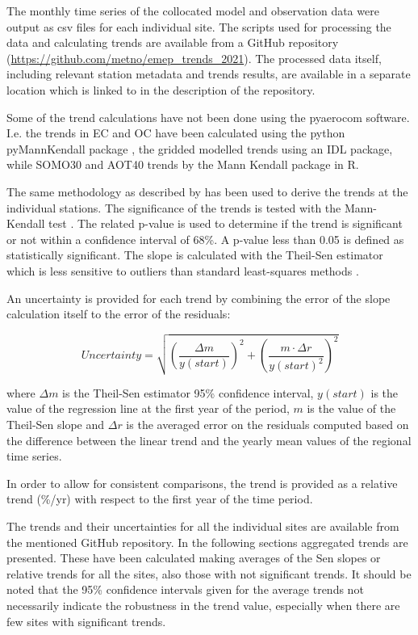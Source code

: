 The monthly time series of the collocated model and observation data were output as csv files for each individual site. The scripts used for processing the data and calculating trends are available from a GitHub repository (\url{https://github.com/metno/emep_trends_2021}). The processed data itself, including relevant station metadata and trends results, are available in a separate location which is linked to in the description of the repository.

Some of the trend calculations have not been done using the pyaerocom software. I.e. the trends in EC and OC have been calculated using the python pyMannKendall package \citep{Hussain2019}, the gridded modelled trends using an IDL package, while SOMO30 and AOT40 trends by the Mann Kendall package in R.

The same methodology as described by \cite{aas2019global, mortier2020} has been used to derive the trends at the individual stations. The significance of the trends is tested with the Mann-Kendall test \citep{hamed1998modified}. The related p-value is used to determine if the trend is significant or not within a confidence interval of 68\%. A p-value less than 0.05 is defined as statistically significant. The slope is calculated with the Theil-Sen estimator which is less sensitive to outliers than standard least-squares methods \citep{sen1968estimates}.

An uncertainty is provided for each trend by combining the error of the slope calculation itself to the error of the residuals:

\begin{equation}
 Uncertainty = \sqrt{{\left (\frac{\Delta m}{y(start)}\right )}^{2} + {\left ( \frac{m \cdot \Delta r}{y(start)^2}\right )}^{2} }
\end{equation}

where $\Delta m$ is the Theil-Sen estimator 95\% confidence interval, $y(start)$ is the value of the regression line at the first year of the period, $m$ is the value of the Theil-Sen slope and $\Delta r$ is the averaged error on the residuals computed based on the difference between the linear trend and the yearly mean values of the regional time series.

In order to allow for consistent comparisons, the trend is provided as a relative trend (\%/yr) with respect to the first year of the time period.

The trends and their uncertainties for all the individual sites are available from the mentioned GitHub repository. In the following sections aggregated trends are presented. These have been calculated making averages of the Sen slopes or relative trends for all the sites, also those with not significant trends. It should be noted that the 95\% confidence intervals given for the average trends not necessarily indicate the robustness in the trend value, especially when there are few sites with significant trends.


